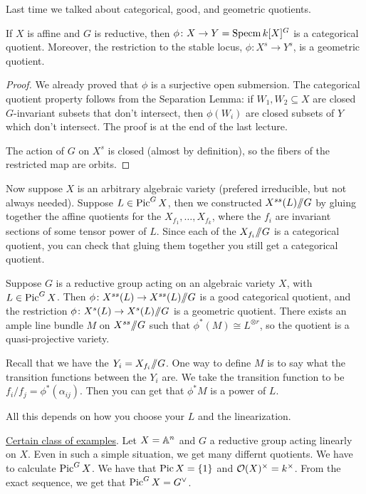 
Last time we talked about categorical, good, and geometric quotients.
\begin{proposition}
 If $X$ is affine and $G$ is reductive, then $\phi\colon X\to Y=\specm k[X]^G$ is a categorical quotient. Moreover, the restriction to the stable locus, $\phi\colon X^s\to Y^s$, is a geometric quotient.
\end{proposition}
\begin{proof}
 We already proved that $\phi$ is a surjective open submersion. The categorical quotient property follows from the Separation Lemma: if $W_1,W_2\subseteq X$ are closed $G$-invariant subsets that don't intersect, then $\phi(W_i)$ are closed subsets of $Y$ which don't intersect. The proof is at the end of the last lecture.
 
 The action of $G$ on $X^s$ is closed (almost by definition), so the fibers of the restricted map are orbits.
\end{proof}
Now suppose $X$ is an arbitrary algebraic variety (prefered irreducible, but not always needed). Suppose $L\in \pic^G X$, then we constructed $X^{ss}(L)\quot G$ by gluing together the affine quotients for the $X_{f_1},\dots, X_{f_k}$, where the $f_i$ are invariant sections of some tensor power of $L$. Since each of the $X_{f_i}\quot G$ is a categorical quotient, you can check that gluing them together you still get a categorical quotient.

\begin{theorem}
 Suppose $G$ is a reductive group acting on an algebraic variety $X$, with $L\in \pic^G X$. Then $\phi\colon X^{ss}(L)\to X^{ss}(L)\quot G$ is a good categorical quotient, and the restriction $\phi\colon X^s(L)\to X^s(L)\quot G$ is a geometric quotient. There exists an ample line bundle $M$ on $X^{ss}\quot G$ such that $\phi^*(M)\cong L^{\otimes r}$, so the quotient is a quasi-projective variety. 
\end{theorem}
Recall that we have the $Y_i=X_{f_i}\quot G$. One way to define $M$ is to say what the transition functions between the $Y_i$ are. We take the transition function to be $f_i/f_j= \phi^*(\alpha_{ij})$. Then you can get that $\phi^*M$ is a power of $L$.

All this depends on how you choose your $L$ and the linearization.

\bigskip

\underline{Certain class of examples}. Let $X=\AA^n$ and $G$ a reductive group acting linearly on $X$. Even in such a simple situation, we get many differnt quotients. We have to calculate $\pic^G X$. We have that $\pic X=\{1\}$ and $\O(X)^\times=k^\times$. From the exact sequence, we get that $\pic^G X=G^\vee$.

